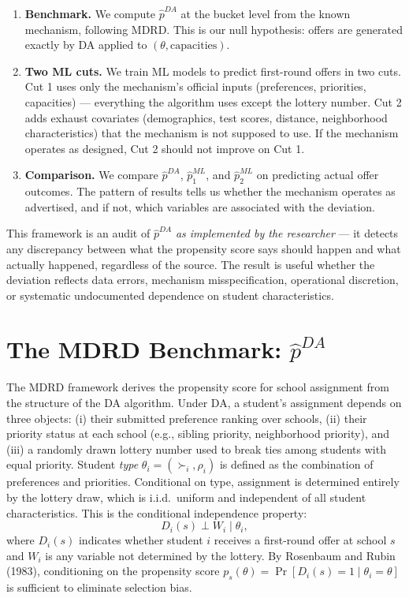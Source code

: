 \documentclass[12pt,a4paper,dvipsnames]{article}
\begin{document}
\begin{enumerate}
    \item \textbf{Benchmark.} We compute $\hat{p}^{DA}$ at the bucket level from the known mechanism, following MDRD. This is our null hypothesis: offers are generated exactly by DA applied to $(\theta, \text{capacities})$.

    \item \textbf{Two ML cuts.} We train ML models to predict first-round offers in two cuts. Cut 1 uses only the mechanism's official inputs (preferences, priorities, capacities) --- everything the algorithm uses except the lottery number. Cut 2 adds exhaust covariates (demographics, test scores, distance, neighborhood characteristics) that the mechanism is not supposed to use. If the mechanism operates as designed, Cut 2 should not improve on Cut 1.

    \item \textbf{Comparison.} We compare $\hat{p}^{DA}$, $\hat{p}^{ML}_1$, and $\hat{p}^{ML}_2$ on predicting actual offer outcomes. The pattern of results tells us whether the mechanism operates as advertised, and if not, which variables are associated with the deviation.
\end{enumerate}

\noindent This framework is an audit of $\hat{p}^{DA}$ \textit{as implemented by the researcher} --- it detects any discrepancy between what the propensity score says should happen and what actually happened, regardless of the source. The result is useful whether the deviation reflects data errors, mechanism misspecification, operational discretion, or systematic undocumented dependence on student characteristics.

\section{The MDRD Benchmark: $\hat{p}^{DA}$}

The MDRD framework derives the propensity score for school assignment from the structure of the DA algorithm. Under DA, a student's assignment depends on three objects: (i) their submitted preference ranking over schools, (ii) their priority status at each school (e.g., sibling priority, neighborhood priority), and (iii) a randomly drawn lottery number used to break ties among students with equal priority. Student \textit{type} $\theta_i = (\succ_i, \rho_i)$ is defined as the combination of preferences and priorities. Conditional on type, assignment is determined entirely by the lottery draw, which is i.i.d.\ uniform and independent of all student characteristics. This is the conditional independence property:
\[
D_i(s) \perp W_i \mid \theta_i,
\]
where $D_i(s)$ indicates whether student $i$ receives a first-round offer at school $s$ and $W_i$ is any variable not determined by the lottery. By Rosenbaum and Rubin (1983), conditioning on the propensity score $p_s(\theta) = \Pr[D_i(s) = 1 \mid \theta_i = \theta]$ is sufficient to eliminate selection bias.
\end{document}
